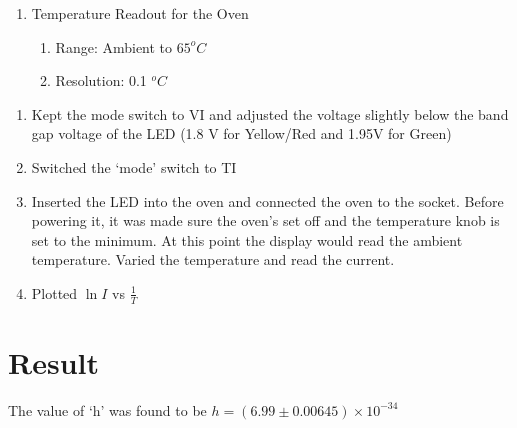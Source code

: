 \begin{enumerate}
\begin{enumerate}
\begin{enumerate}
						\end{enumerate}
					\item Temperature Readout for the Oven
						\begin{enumerate}
							\item Range: Ambient to $65^oC$
							\item Resolution: 0.1 $^oC$
						\end{enumerate}
				\end{enumerate}
				\begin{enumerate}
					\item Kept the mode switch to VI and adjusted the voltage slightly below the band gap voltage of the LED (1.8 V for Yellow/Red and 1.95V for Green)
					\item Switched the `mode' switch to TI
					\item Inserted the LED into the oven and connected the oven to the socket. Before powering it, it was made sure the oven's set off and the temperature knob is set to the minimum. At this point the display would read the ambient temperature. Varied the temperature and read the current.
					\item Plotted $\ln I$ vs $\frac 1 T$
				\end{enumerate}
		\end{enumerate}

\section{Result}
	The value of `h' was found to be $h=(6.99 \pm 0.00645)\times 10^{-34} $